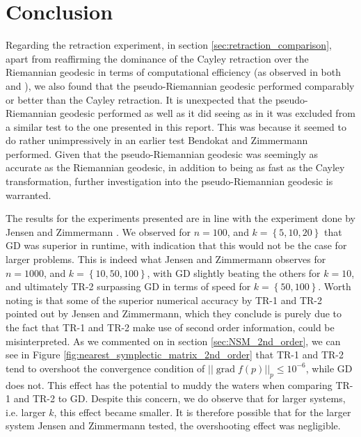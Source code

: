 \section{Conclusion}



Regarding the retraction experiment, in section \ref{sec:retraction_comparison}, apart from reaffirming the dominance of the Cayley retraction over the Riemannian geodesic in terms of computational efficiency (as observed in both \cite[p.~8]{JensenZimmermann2024} and \cite[p.~26]{BendokatZimmermann2021}), we also found that the pseudo-Riemannian geodesic performed comparably or better than the Cayley retraction. It is unexpected that the pseudo-Riemannian geodesic performed as well as it did seeing as in \cite[p.~28]{BendokatZimmermann2021} it was excluded from a similar test to the one presented in this report. This was because it seemed to do rather unimpressively in an earlier test Bendokat and Zimmermann performed. Given that the pseudo-Riemannian geodesic was seemingly as accurate as the Riemannian geodesic, in addition to being as fast as the Cayley transformation, further investigation into the pseudo-Riemannian geodesic is warranted.

The results for the experiments presented are in line with the experiment done by Jensen and Zimmermann \cite[Tbl.~41]{JensenZimmermann2024}. We observed for $n=100$, and $k=\left\{ 5,10,20 \right\}$ that GD was superior in runtime, with indication that this would not be the case for larger problems. This is indeed what Jensen and Zimmermann observes for $n=1000$, and $k=\left\{ 10,50,100 \right\}$, with GD slightly beating the others for $k=10$, and ultimately TR-2 surpassing GD in terms of speed for $k=\left\{ 50,100 \right\}$. Worth noting is that some of the superior numerical accuracy by TR-1 and TR-2 pointed out by Jensen and Zimmermann, which they conclude is purely due to the fact that TR-1 and TR-2 make use of second order information, could be misinterpreted. As we commented on in section \ref{sec:NSM_2nd_order}, we can see in Figure \ref{fig:nearest_symplectic_matrix_2nd_order} that TR-1 and TR-2 tend to overshoot the convergence condition of $\lvert \lvert \operatorname{grad}f(p) \rvert \rvert_{p}\leq10^{-6}$, while GD does not. This effect has the potential to muddy the waters when comparing TR-1 and TR-2 to GD. Despite this concern, we do observe that for larger systems, i.e. larger $k$, this effect became smaller. It is therefore possible that for the larger system Jensen and Zimmermann tested, the overshooting effect was negligible.

